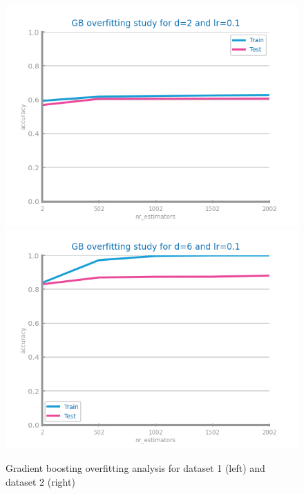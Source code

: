 \documentclass[10pt]{extarticle}
\begin{document}
\begin{figure}[H]
\centering\includegraphics[scale=0.95]{images/dataset1/models_evaluation/CovidPos_gb_accuracy_overfitting.png}
\includegraphics[scale=0.95]{images/dataset2/models_evaluation/Credit_Score_gb_accuracy_overfitting.png}
\caption{Gradient boosting overfitting analysis for dataset 1 (left) and dataset 2 (right)}
\end{figure}
\end{document}
